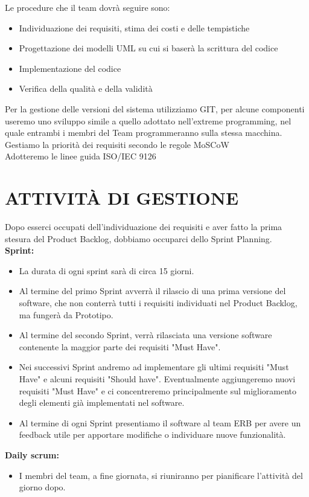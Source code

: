 \documentclass{report}
\begin{document}
Le procedure che il team dovrà seguire sono:
\begin{itemize}
\item Individuazione dei requisiti, stima dei costi e delle tempistiche
\item Progettazione dei modelli UML su cui si baserà la scrittura del codice
\item Implementazione del codice
\item Verifica della qualità e della validità
\end{itemize}
Per la gestione delle versioni del sistema utilizziamo GIT, per alcune componenti useremo uno sviluppo simile a quello adottato nell'extreme programming, nel quale entrambi i membri del Team programmeranno sulla stessa macchina.\\
Gestiamo la priorità dei requisiti secondo le regole MoSCoW\\
Adotteremo le linee guida ISO/IEC 9126


\chapter{ATTIVITÀ DI GESTIONE}
Dopo esserci occupati dell'individuazione dei requisiti e aver fatto la prima stesura del Product Backlog, dobbiamo occuparci dello Sprint Planning.	\\
\textbf{Sprint:}\\
\begin{itemize}
\item La durata di ogni sprint sarà di circa 15 giorni.
\item Al termine del primo Sprint avverrà il rilascio di una prima versione del software, che non conterrà tutti i requisiti individuati nel Product Backlog, ma fungerà da Prototipo.
\item Al termine del secondo Sprint, verrà rilasciata una versione software contenente la maggior parte dei requisiti "Must Have".
\item Nei successivi Sprint andremo ad implementare gli ultimi requisiti "Must Have" e alcuni requisiti "Should have".
Eventualmente aggiungeremo nuovi requisiti "Must Have" e ci concentreremo principalmente sul miglioramento degli elementi già implementati nel software.
\item Al termine di ogni Sprint presentiamo il software al team ERB per avere un feedback utile per apportare modifiche o individuare nuove funzionalità.
\end{itemize}

\textbf{Daily scrum:}\\
\begin{itemize}
\item I membri del team, a fine giornata, si riuniranno per pianificare l'attività del giorno dopo.
\end{itemize}
\end{document}
